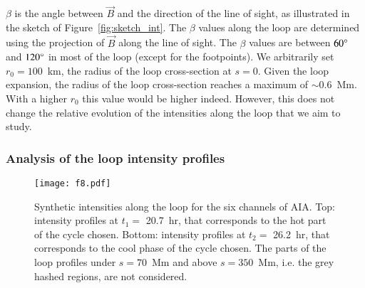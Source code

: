 \documentclass[preprint2]{aastex6}
\begin{document}
$\beta$ is the angle between $\vec B$ and the direction of the line of sight, as illustrated in the sketch of Figure~\ref{fig:sketch_int}. 
The $\beta$ values along the loop are determined using the projection of $\vec B$ along the line of sight. The $\beta$ values are between $60\degree$ and $120\degree$ in most of the loop (except for the footpoints).
We arbitrarily set $r_0=100$~km, the radius of the loop cross-section at $s=0$. Given the loop expansion, the radius of the loop cross-section reaches a maximum of $\sim 0.6 $~Mm. With a higher $r_0$ this value would be higher indeed. However, this does not change the relative evolution of the intensities along the loop that we aim to study.

	\subsubsection{Analysis of the loop intensity profiles}
	
	
	\begin{figure}  
		\centering
                 \texttt{[image: f8.pdf]}
                 \caption{Synthetic intensities along the loop for the six channels of AIA. Top: intensity profiles at $t_1 = $ 20.7~hr, that corresponds to the hot part of the cycle chosen. Bottom: intensity profiles at $t_2 = $ 26.2~hr, that corresponds to the cool phase of the cycle chosen. The parts of the loop profiles under $s=70$~Mm and above $s=350$~Mm, i.e. the grey hashed regions, are not considered.}
                 \label{fig:profile_int_loop_simu}
	\end{figure}
		
\end{document}
